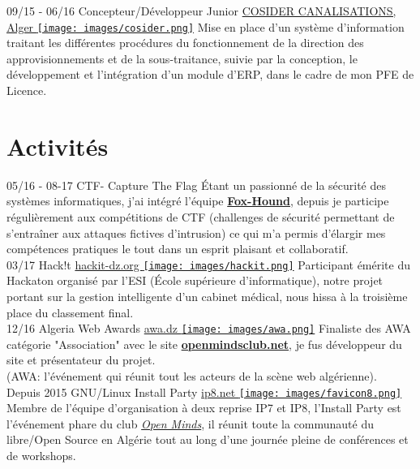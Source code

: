 \documentclass[]{friggeri-cv}
\begin{document}
\begin{entrylist}
  \entry
    {09/15 - 06/16}
    {Concepteur/Développeur Junior}
    {\href{http://www.cosider-groupe.dz/fr/cosider-canalisations}{COSIDER CANALISATIONS, Alger \texttt{[image: images/cosider.png]}}}
    {Mise en place d'un système d'information traitant les différentes procédures du fonctionnement de la direction des approvisionnements et de la sous-traitance, suivie par la conception, le développement et l'intégration d'un module d'ERP, dans le cadre de mon PFE de Licence.\\}
  
\end{entrylist}

\newpage
\section{Activités}
\begin{entrylist}
  \entry
    {05/16 - 08-17}
    {CTF- Capture The Flag}
    {}
    {Étant un passionné de la sécurité des systèmes informatiques, j'ai intégré l'équipe \href{https://web.facebook.com/F0xHo2Nd/}{\textbf{Fox-Hound}}, depuis je participe régulièrement aux compétitions de CTF (challenges de sécurité permettant de s’entraîner aux attaques fictives d’intrusion) ce qui m'a permis d'élargir mes compétences pratiques le tout dans un esprit plaisant et collaboratif.\\}
  \entry
    {03/17}
    {Hack!t}
    {\href{http://www.hackit-dz.org/}{hackit-dz.org  \texttt{[image: images/hackit.png]}}}
    {Participant émérite du Hackaton organisé par l'ESI (École supérieure d'informatique), notre projet portant sur la gestion intelligente d'un cabinet médical, nous hissa à la troisième place du classement final.\\}
  \entry
    {12/16}
    {Algeria Web Awards}
    {\href{https://vote.awa.dz/detail/770/}{awa.dz \texttt{[image: images/awa.png]}}}
    {Finaliste des AWA catégorie "Association" avec le site \href{http://www.openmindsclub.net/}{\textbf{openmindsclub.net}}, je fus développeur du site et présentateur du projet.\\
    (AWA: l’événement qui réunit tout les acteurs de la scène web algérienne).\\}
  \entry
    {Depuis 2015}
    {GNU/Linux Install Party}
    {\href{https://www.openmindsclub.net/ip8}{ip8.net \texttt{[image: images/favicon8.png]}}}
    {Membre de l'équipe d'organisation à deux reprise IP7 et IP8, l'Install Party est l’événement phare du club \href{http://www.openmindsclub.net/}{\emph{Open Minds}}, il réunit toute la communauté du libre/Open Source en Algérie tout au long d'une journée pleine de conférences et de workshops.\\}
    
\end{entrylist}
\end{document}
